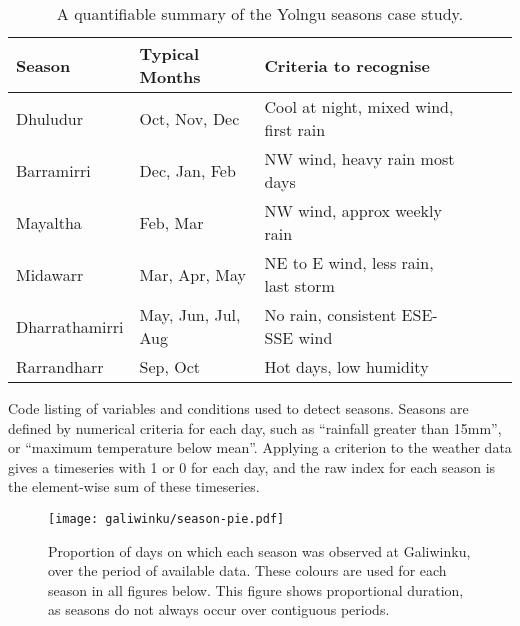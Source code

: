 \begin{table}[h]
    \centering
    \caption{A quantifiable summary of the Yolngu seasons case study.}
    \label{tab:quant-seasons-summary}
    \sffamily\small
    \begin{tabular}{llllll}
        \toprule
        Season          &  Typical Months       &  Criteria to recognise                    \\
        \midrule
        Dhuludur        &  Oct, Nov, Dec        &  Cool at night, mixed wind, first rain    \\
        Barramirri      &  Dec, Jan, Feb        &  NW wind, heavy rain most days            \\
        Mayaltha        &  Feb, Mar             &  NW wind, approx weekly rain              \\
        Midawarr        &  Mar, Apr, May        &  NE to E wind, less rain, last storm      \\
        Dharrathamirri  &  May, Jun, Jul, Aug   &  No rain, consistent ESE-SSE wind         \\
        Rarrandharr     &  Sep, Oct             &  Hot days, low humidity                   \\
        \bottomrule
    \end{tabular}
\end{table}

\begin{framedbox}
    \centering
    \caption[Python code: definition of season indices]{
        Code listing of variables and conditions used to detect seasons.
        Seasons are defined by numerical criteria for each day, such as
        ``rainfall greater than 15mm'', or ``maximum temperature below mean''.
        Applying a criterion to the weather data gives a timeseries with 1 or 0
        for each day, and the raw index for each season is the element-wise
        sum of these timeseries.}
    \label{fig:season-definitions-code}
    
\end{framedbox}


\begin{SCfigure}[][h]
    \centering
    \texttt{[image: galiwinku/season-pie.pdf]}
    \caption[Calculated season frequency, Galiwinku]{
        Proportion of days on which each season was observed at
        Galiwinku, over the period of available data.
        These colours are used for each season in all figures below.
        This figure shows proportional duration, as seasons do not
        always occur over contiguous periods.
        }
    \label{fig:galiwinku-season-pie}
\end{SCfigure}


